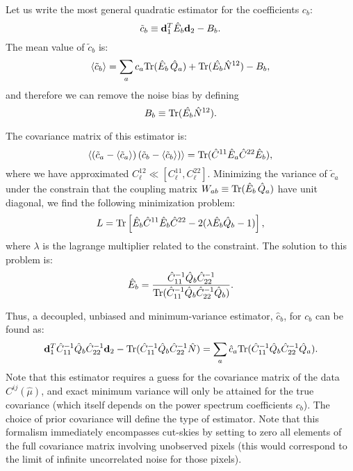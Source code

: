 \documentclass[a4paper,10pt]{article}
\newcommand{\Tr}{{\rm Tr}}
\begin{document}
Let us write the most general quadratic estimator for the coefficients $c_b$:
\begin{equation}
 \tilde{c}_b\equiv {\bf d}^T_1\hat{E}_b{\bf d}_2-B_b.
\end{equation}
The mean value of $\tilde{c}_b$ is:
\begin{equation}
 \langle\tilde{c}_b\rangle=\sum_a c_a\Tr(\hat{E}_b\,\hat{Q}_a)+
 \Tr(\hat{E_b}\hat{N}^{12})-B_b,
\end{equation}
and therefore we can remove the noise bias by defining
\begin{equation}
  B_b\equiv\Tr(\hat{E_b}\hat{N}^{12}).
\end{equation}

The covariance matrix of this estimator is:
\begin{equation}
 \left\langle(\tilde{c}_a-\langle\tilde{c}_a\rangle)\,
 (\tilde{c}_b-\langle\tilde{c}_b\rangle)\right\rangle=
 \Tr(\hat{C}^{11}\hat{E}_a\hat{C}^{22}\hat{E}_b),
\end{equation}
where we have approximated $C_\ell^{12}\ll[C_\ell^{11},C_\ell^{22}]$. Minimizing
the variance of $\tilde{c}_a$ under the constrain that the coupling matrix
$W_{ab}\equiv\Tr(\hat{E}_b\,\hat{Q}_a)$ have unit diagonal, we find the following
minimization problem:
\begin{equation}
  L=\Tr\left[\hat{E}_b\hat{C}^{11}\hat{E}_b\hat{C}^{22}-
  2(\lambda\hat{E}_b\hat{Q}_b-1)\right],
\end{equation}
where $\lambda$ is the lagrange multiplier related to the constraint. The solution
to this problem is:
\begin{equation}
 \hat{E}_b=\frac{\hat{C}_{11}^{-1}\hat{Q}_b\hat{C}_{22}^{-1}}
 {\Tr(\hat{C}^{-1}_{11}\hat{Q}_b\hat{C}^{-1}_{22}\hat{Q}_b)}.
\end{equation}

Thus, a decoupled, unbiased and minimum-variance estimator, $\hat{c}_b$, for
$c_b$ can be found as:
\begin{equation}
 {\bf d}^T_1\hat{C}^{-1}_{11}\hat{Q}_b\hat{C}^{-1}_{22}{\bf d}_2-
 \Tr(\hat{C}^{-1}_{11}\hat{Q}_b\hat{C}^{-1}_{22}\hat{N})
 =\sum_a \hat{c}_a\Tr(\hat{C}^{-1}_{11}\hat{Q}_b\hat{C}^{-1}_{22}\hat{Q}_a).
\end{equation}
Note that this estimator requires a guess for the covariance matrix of the data
$C^{ij}(\hat{\mu})$, and exact minimum variance will only be attained for the true
covariance (which itself depends on the power spectrum coefficients $c_b$).
The choice of prior covariance will define the type of estimator. Note that this
formalism immediately encompasses cut-skies by setting to zero all elements of the
full covariance matrix involving unobserved pixels (this would correspond to the
limit of infinite uncorrelated noise for those pixels).
\end{document}
